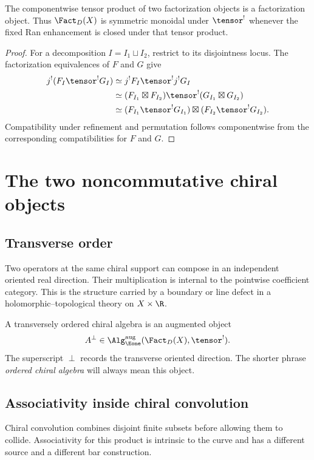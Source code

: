 \begin{proposition}
The componentwise tensor product of two factorization objects is a factorization object. Thus $\Fact_D(X)$ is symmetric monoidal under $\tensor^!$ whenever the fixed Ran enhancement is closed under that tensor product.
\end{proposition}
\begin{proof}
For a decomposition $I=I_1\sqcup I_2$, restrict to its disjointness locus. The factorization equivalences of $F$ and $G$ give
\[
\begin{aligned}
 j^!(F_I\tensor^!G_I)
 &\simeq j^!F_I\tensor^!j^!G_I\\
 &\simeq (F_{I_1}\boxtimes F_{I_2})\tensor^!
          (G_{I_1}\boxtimes G_{I_2})\\
 &\simeq (F_{I_1}\tensor^!G_{I_1})\boxtimes
          (F_{I_2}\tensor^!G_{I_2}).
\end{aligned}
\]
Compatibility under refinement and permutation follows componentwise from the corresponding compatibilities for $F$ and $G$.
\end{proof}


\chapter{The two noncommutative chiral objects}
\section{Transverse order}
Two operators at the same chiral support can compose in an independent
oriented real direction. Their multiplication is internal to the pointwise
coefficient category. This is the structure carried by a boundary or line
defect in a holomorphic--topological theory on $X\times\R$.

\begin{definition}
A transversely ordered chiral algebra is an augmented object
\[
 A^\perp\in\Alg_{\Eone}^{\mathrm{aug}}(\Fact_D(X),\tensor^!).
\]
The superscript $\perp$ records the transverse oriented direction.  The shorter phrase \emph{ordered chiral algebra} will always mean this object.
\end{definition}

\section{Associativity inside chiral convolution}
Chiral convolution combines disjoint finite subsets before allowing them to collide.  Associativity for this product is intrinsic to the curve and has a different source and a different bar construction.

